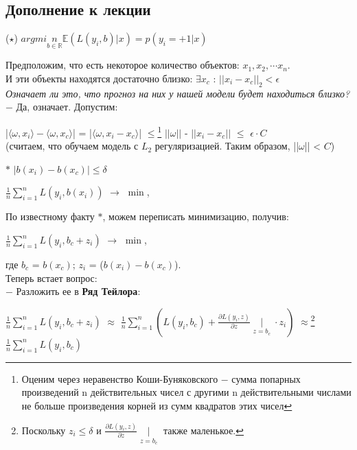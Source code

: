         \subsection{Дополнение к лекции}
    
        \begin{center}
            \large ($\star$) $argmin\limits_{b \in \mathbb{R}}\mathbb{E}(L(y_i, b)|x) = p(y_i = +1 | x)$
        \end{center}
        Предположим, что есть некоторое количество объектов: $x_1, x_2, \cdots x_n$.\\

        И эти объекты находятся достаточно близко: $\exists x_c$ : $||x_i - x_c||_2 < \epsilon$\\

        \textit{Означает ли это, что прогноз на них у нашей модели будет находиться близко?} $-$ Да, означает. Допустим:
        \begin{center}
            |$\langle\omega, x_i\rangle - \langle\omega, x_c\rangle$| = |$\langle\omega, x_i - x_c\rangle$| $\leq$\footnote{Оценим через неравенство Коши-Буняковского $-$ сумма попарных произведений n действительных чисел с другими n действительными числами не больше произведения корней из сумм квадратов этих чисел} $||\omega||$ - $||x_i - x_c||$ $\leq$ $\epsilon \cdot C$\\
            
            (считаем, что обучаем модель с $L_2$ регуляризацией. Таким образом, ||$\omega$|| < $C$)
        \end{center}

        $\ast$  $|b(x_i) - b(x_c)| \leq \delta $\\

        \begin{center}
            $\frac{1}{n}\sum\limits_{i = 1}^nL(y_i, b(x_i))$ $\longrightarrow$ $\min$,
        \end{center}

        По известному факту $\ast$, можем переписать минимизацию, получив:
        \begin{center}
            $\frac{1}{n}\sum\limits_{i = 1}^nL(y_i, b_c + z_i)$ $\longrightarrow$ $\min$,
        \end{center}
        где $b_c$ = $b(x_c)$; $z_i$ = ($b(x_i) - b(x_c)$).\\

        Теперь встает вопрос: \\
        $-$ Разложить ее в \textbf{Ряд Тейлора}:
        \begin{center}
            $\frac{1}{n}\sum\limits_{i = 1}^nL(y_i, b_c + z_i)$  $\approx$ $\frac{1}{n}\sum\limits_{i = 1}^n(L(y_i, b_c) + \frac{\partial L(y_i, z)}{\partial z}\mid\limits_{z = b_c } \cdot z_i)$ $\approx$\footnote{Поскольку $z_i \leq \delta$ и $\frac{\partial L(y_i, z)}{\partial z}\mid\limits_{z = b_c }$ также маленькое.} $\frac{1}{n}\sum\limits_{i = 1}^nL(y_i, b_c)$
        \end{center}


